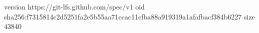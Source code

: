 version https://git-lfs.github.com/spec/v1
oid sha256:f7315814c2d5251fa2e5b55aa71ccac11cfba88a919319a1afafbacf384b6227
size 43840

